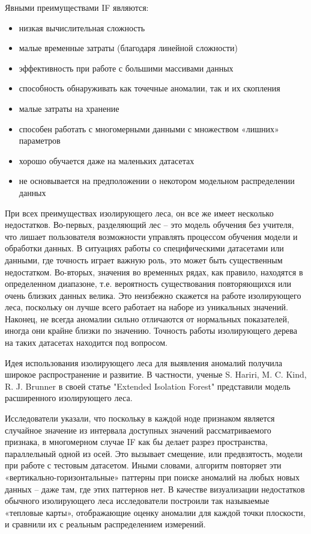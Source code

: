 \documentclass[14pt, letterpaper]{extarticle}
\begin{document}
Явными преимуществами IF являются:
\begin{itemize} 
    \item низкая вычислительная сложность
    \item малые временные затраты (благодаря линейной сложности)
    \item эффективность при работе с большими массивами данных
    \item способность обнаруживать как точечные аномалии, так и их скопления
    \item малые затраты на хранение
    \item способен работать с многомерными данными с множеством «лишних» параметров
    \item хорошо обучается даже на маленьких датасетах
    \item не основывается на предположении о некотором модельном распределении данных
\end{itemize}

При всех преимуществах изолирующего леса, он все же имеет несколько недостатков. Во-первых, разделяющий лес – это модель обучения без учителя, что лишает пользователя возможности управлять процессом обучения модели и обработки данных. В ситуациях работы со специфическими датасетами или данными, где точность играет важную роль, это может быть существенным недостатком. Во-вторых, значения во временных рядах, как правило, находятся в определенном диапазоне, т.е. вероятность существования повторяющихся или очень близких данных велика. Это неизбежно скажется на работе изолирующего леса, поскольку он лучше всего работает на наборе из уникальных значений. Наконец, не всегда аномалии сильно отличаются от нормальных показателей, иногда они крайне близки по значению. Точность работы изолирующего дерева на таких датасетах находится под вопросом.

Идея использования изолирующего леса для выявления аномалий получила широкое распространение и развитие. В частности, ученые S. Hariri, M. C. Kind, R. J. Brunner в своей статье "Extended Isolation Forest" \cite{hariri2019extended} представили модель расширенного изолирующего леса. 

Исследователи указали, что поскольку в каждой ноде признаком является случайное значение из интервала доступных значений рассматриваемого признака, в многомерном случае IF как бы делает разрез пространства, параллельный одной из осей. Это вызывает смещение, или предвзятость, модели при работе с тестовым датасетом. Иными словами, алгоритм повторяет эти «вертикально-горизонтальные» паттерны при поиске аномалий на любых новых данных – даже там, где этих паттернов нет. В качестве визуализации недостатков обычного изолирующего леса исследователи построили так называемые «тепловые карты», отображающие оценку аномалии для каждой точки плоскости, и сравнили их с реальным распределением измерений. 
\end{document}
